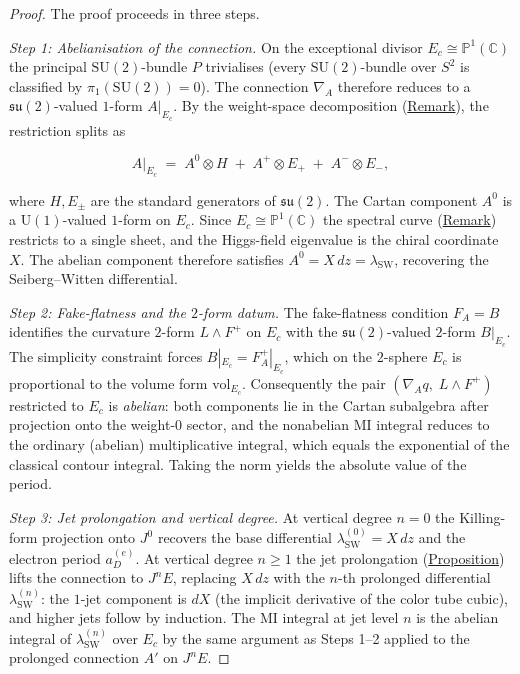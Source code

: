 \begin{proof}
The proof proceeds in three steps.

\emph{Step 1: Abelianisation of the connection.}
On the exceptional divisor $E_c \cong \mathbb{P}^1(\mathbb{C})$ the principal
$\mathrm{SU}(2)$-bundle $P$ trivialises (every $\mathrm{SU}(2)$-bundle
over $S^2$ is classified by $\pi_1(\mathrm{SU}(2)) = 0$).  The
connection $\nabla_A$ therefore reduces to a $\mathfrak{su}(2)$-valued
$1$-form $A|_{E_c}$.  By the weight-space decomposition
(\hyperref[rem:weight-space-decomposition]{Remark}), the restriction splits as

\[
A\big|_{E_c}
  \;=\;
  A^0 \otimes H
  \;+\;
  A^+ \otimes E_+
  \;+\;
  A^- \otimes E_-,
\]

where $H, E_\pm$ are the standard generators of $\mathfrak{su}(2)$.
The Cartan component $A^0$ is a $\mathrm{U}(1)$-valued $1$-form on
$E_c$.  Since $E_c \cong \mathbb{P}^1(\mathbb{C})$ the spectral curve
(\hyperref[rem:chiral-bundles]{Remark}) restricts to a single sheet, and the
Higgs-field eigenvalue is the chiral coordinate $X$.  The abelian
component therefore satisfies $A^0 = X\,dz = \lambda_{\mathrm{SW}}$,
recovering the Seiberg--Witten
differential.

\emph{Step 2: Fake-flatness and the $2$-form datum.}
The fake-flatness condition $F_A = B$ identifies
the curvature $2$-form $L \wedge F^+$ on $E_c$ with the
$\mathfrak{su}(2)$-valued $2$-form $B|_{E_c}$.  The simplicity constraint
forces $B|_{E_c} = F_A^+|_{E_c}$, which on the $2$-sphere $E_c$ is
proportional to the volume form $\mathrm{vol}_{E_c}$.  Consequently
the pair $(\nabla_A q,\; L \wedge F^+)$ restricted to $E_c$ is
\emph{abelian}: both components lie in the Cartan subalgebra after
projection onto the weight-$0$ sector, and the nonabelian MI integral
reduces to the ordinary (abelian) multiplicative integral, which equals
the exponential of the classical contour integral.  Taking the norm
yields the absolute value of the period.

\emph{Step 3: Jet prolongation and vertical degree.}
At vertical degree $n = 0$ the Killing-form projection onto $J^0$
recovers the base differential $\lambda_{\mathrm{SW}}^{(0)} = X\,dz$
and the electron period $a_D^{(e)}$.  At vertical degree $n \geq 1$ the
jet prolongation (\hyperref[prop:jet-prolongation]{Proposition}) lifts the
connection to $J^n E$, replacing $X\,dz$ with the $n$-th prolonged
differential $\lambda_{\mathrm{SW}}^{(n)}$: the $1$-jet component is
$dX$ (the implicit derivative of the color tube
cubic), and higher jets follow by induction.
The MI integral at jet level $n$ is the abelian integral of
$\lambda_{\mathrm{SW}}^{(n)}$ over $E_c$ by the same argument as
Steps 1--2 applied to the prolonged connection $A'$ on $J^n E$.
\end{proof}

